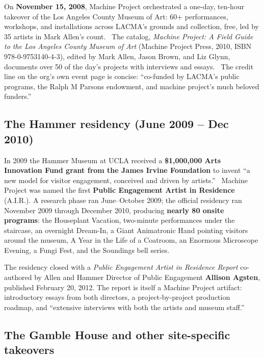 \documentclass[10pt,letterpaper,twocolumn]{article}
\begin{document}
On \textbf{November 15, 2008}, Machine Project orchestrated a one-day, ten-hour takeover of the Los Angeles County Museum of Art: 60+ performances, workshops, and installations across LACMA's grounds and collection, free, led by 35 artists in Mark Allen's count.~\citep{lacmafieldguide} The catalog, \emph{Machine Project: A Field Guide to the Los Angeles County Museum of Art} (Machine Project Press, 2010, ISBN 978-0-9753140-4-3), edited by Mark Allen, Jason Brown, and Liz Glynn, documents over 50 of the day's projects with interviews and essays.~\citep{fieldguidebook} The credit line on the org's own event page is concise: ``co-funded by LACMA's public programs, the Ralph M Parsons endowment, and machine project's much beloved funders.''~\citep{lacmafieldguide}

\subsection{The Hammer residency (June 2009 -- Dec 2010)}

In 2009 the Hammer Museum at UCLA received a \textbf{\$1,000,000 Arts Innovation Fund grant from the James Irvine Foundation} to invent ``a new model for visitor engagement, conceived and driven by artists.''~\citep{hammerresidency,artmuseumteaching} Machine Project was named the first \textbf{Public Engagement Artist in Residence} (A.I.R.). A research phase ran June--October 2009; the official residency ran November 2009 through December 2010, producing \textbf{nearly 80 onsite programs}: the Houseplant Vacation, two-minute performances under the staircase, an overnight Dream-In, a Giant Animatronic Hand pointing visitors around the museum, A Year in the Life of a Coatroom, an Enormous Microscope Evening, a Fungi Fest, and the Soundings bell series.~\citep{hammerresidency,hammerreport,artmuseumteaching}

The residency closed with a \emph{Public Engagement Artist in Residence Report} co-authored by Allen and Hammer Director of Public Engagement \textbf{Allison Agsten}, published February 20, 2012. The report is itself a Machine Project artifact: introductory essays from both directors, a project-by-project production roadmap, and ``extensive interviews with both the artists and museum staff.''~\citep{hammerreport}

\subsection{The Gamble House and other site-specific takeovers}
\end{document}
